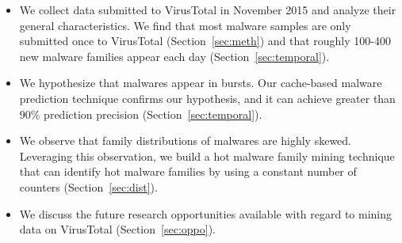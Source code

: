 \begin{itemize}

\item We collect data submitted to VirusTotal in November 2015 
and analyze their general characteristics. 
We find that most malware samples are only submitted once to VirusTotal (Section~\ref{sec:meth}) 
and that roughly 100-400 new malware families appear each day (Section~\ref{sec:temporal}). 


\item We hypothesize that malwares appear in bursts. 
Our cache-based malware prediction technique confirms our hypothesis, 
and it can achieve greater than 90\% prediction precision (Section~\ref{sec:temporal}). 

\item We observe that family distributions of malwares are highly skewed. 
Leveraging this observation, we build a hot malware family mining technique that can identify hot 
malware families by using a constant number of counters (Section~\ref{sec:dist}).

\item We discuss the future research opportunities available with regard to mining data on VirusTotal (Section~\ref{sec:oppo}). 

\end{itemize}


